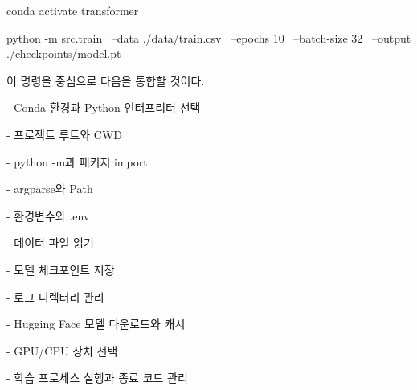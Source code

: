 \begin{dhkzsh}
conda activate transformer

python -m src.train \
    --data ./data/train.csv \
    --epochs 10 \
    --batch-size 32 \
    --output ./checkpoints/model.pt
\end{dhkzsh}

이 명령을 중심으로 다음을 통합할 것이다.

\begin{dhksmry}
    - Conda 환경과 Python 인터프리터 선택

    - 프로젝트 루트와 CWD

    - python -m과 패키지 import

    - argparse와 Path

    - 환경변수와 .env

    - 데이터 파일 읽기

    - 모델 체크포인트 저장

    - 로그 디렉터리 관리

    - Hugging Face 모델 다운로드와 캐시

    - GPU/CPU 장치 선택

    - 학습 프로세스 실행과 종료 코드 관리
\end{dhksmry}

